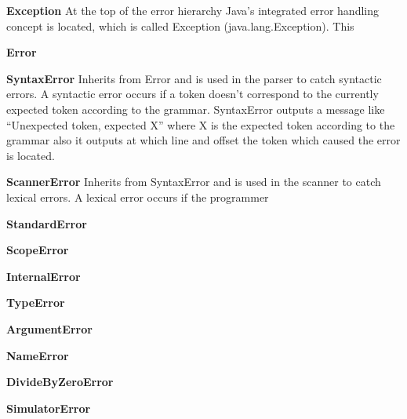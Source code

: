 \begin{dlist}
	\item[\textbf{Exception}] At the top of the error hierarchy Java's integrated error handling concept is located, which is called Exception (java.lang.Exception). This
	\item[\textbf{Error}]
	\item[\textbf{SyntaxError}] Inherits from Error and is used in the parser to catch syntactic errors. A syntactic error occurs if a token doesn't correspond to the currently expected token according to the grammar. SyntaxError outputs a message like ``Unexpected token, expected X'' where X is the expected token according to the grammar also it outputs at which line and offset the token which caused the error is located. 
	\item[\textbf{ScannerError}] Inherits from SyntaxError and is used in the scanner to catch lexical errors. A lexical error occurs if the programmer 
	\item[\textbf{StandardError}]
	\item[\textbf{ScopeError}]
	\item[\textbf{InternalError}]
	\item[\textbf{TypeError}]
	\item[\textbf{ArgumentError}]
	\item[\textbf{NameError}]
	\item[\textbf{DivideByZeroError}]
	\item[\textbf{SimulatorError}]
\end{dlist}


    
